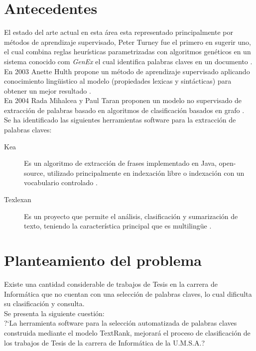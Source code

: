 \section{Antecedentes}
El estado del arte actual en esta \'area esta representado principalmente por
m\'etodos de aprendizaje supervisado, Peter Turney fue el primero en sugerir uno,
el cual combina reglas heur\'isticas parametrizadas con algoritmos gen\'eticos
en un sistema conocido com \emph{GenEx} el cual identifica palabras claves en un
documento \cite{PT99}. \\

En 2003 Anette Hulth propone un m\'etodo de aprendizaje supervisado aplicando
conocimiento ling\"uistico al modelo (propiedades lexicas y sint\'acticas) para obtener
un mejor resultado \cite{AH03}. \\

En 2004 Rada Mihalcea y Paul Taran proponen un modelo no supervisado de extracci\'on
de palabras basado en algoritmos de clasificaci\'on basados en grafo \cite{RMPT04}. \\

Se ha identificado las siguientes herramientas software para la extracci\'on de
palabras claves:
\begin{description}
	\item[Kea] Es un algoritmo de extracci\'on de frases implementado en Java,
	open-source, utilizado principalmente en indexaci\'on libre  o indexaci\'on con
	un vocabulario controlado \cite{KEA}.
	\item[Texlexan] Es un proyecto que permite el an\'alisis, clasificaci\'on y
	sumarizaci\'on de texto, teniendo la caracter\'istica principal que es 
	multiling\"ue \cite{TEXLEXAN}.
\end{description}


\section{Planteamiento del problema}
Existe una cantidad considerable de trabajos de Tesis en la carrera de Inform\'atica 
que no cuentan con una selecci\'on de palabras claves, lo cual dificulta su 
clasificaci\'on y consulta. \\

Se presenta la siguiente cuesti\'on: \\

?`La herramienta software para la selecci\'on automatizada de palabras claves
construida mediante el modelo TextRank, mejorar\'a el proceso de clasificaci\'on 
de los trabajos de Tesis de la carrera de Inform\'atica de la U.M.S.A.?

